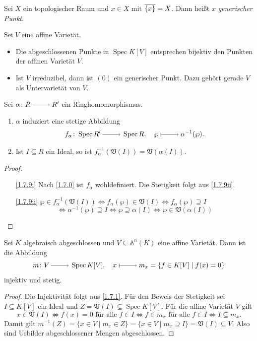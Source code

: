 \documentclass[a4paper,12pt]{scrbook}
\newtheorem{proof}{Beweis}
\def\A{\mathbb{A}}
\def\V{\mathfrak{V}}
\newcommand{\Spec}{\operatorname{Spec}}
\newcommand{\ra}{\raisebox{-1pt}{\tikz{\draw[thin,shorten >=3pt, ->] (0,0) node{\hspace*{-2pt}} -- node{} (1,0);}}\penalty1000\relax}
\renewcommand{\mapsto}{\raisebox{-1pt}{\tikz{\draw[thin,shorten >=3pt, |->] (0,0) node{\hspace*{0pt}} -- node{} (1,0);}}\penalty1000\relax}
\def\Bar#1{\ensuremath\overline{#1}}
\begin{document}
\begin{bem}\label{1.7.7}
  Sei $X$ ein topologischer Raum und $x\in X$ mit $\Bar{\{x\}}=X$. Dann heißt $x$ \emph{generischer Punkt}.
\end{bem}

\begin{bsp}\label{1.7.8}
  Sei $V$ eine affine Varietät.
  \begin{itemize}
  \item Die abgeschlossenen Punkte in $\Spec K[V]$ entsprechen bijektiv den Punkten der affinen Varietät $V$.
  \item Ist $V$ irreduzibel, dann ist $(0)$ ein generischer Punkt. Dazu gehört gerade $V$ als Untervarietät von $V$.
  \end{itemize}
\end{bsp}


\begin{bem}\label{1.7.9}
  Sei $\alpha\colon R\ra R'$ ein Ringhomomorphismus.
  \begin{enumerate}
  \item{} $\alpha$ induziert eine stetige Abbildung \[ f_\alpha\colon \Spec R'\ra\Spec R,\quad
    \wp\mapsto\alpha^{-1}(\wp). \]
  \item{} Ist $I\subseteq R$ ein Ideal, so ist $f_\alpha^{-1}(\V(I))=\V(\alpha(I))$.
  \end{enumerate}
\end{bem}
\begin{proof}
  \begin{enumerate}
  \item[\ref{1.7.9i}] Nach \cref{1.7.0} ist $f_\alpha$ wohldefiniert. Die Stetigkeit folgt aus \ref{1.7.9ii}.
  \item[\ref{1.7.9ii}]
      $\wp\in f_\alpha^{-1}(\V(I)) \iff f_\alpha(\wp)\in\V(I) \iff f_\alpha(\wp)\supseteq I$%
      \[\iff \alpha^{-1}(\wp)\supseteq I \iff \wp\supseteq\alpha(I) \iff \wp\in\V(\alpha(I))\]
  \end{enumerate}
\end{proof}

\begin{prop}\label{1.7.10}
  Sei $K$ algebraisch abgeschlossen und $V\subseteq\A^n(K)$ eine affine Varietät. Dann ist die Abbildung
  \[ m\colon V\ra \Spec K[V], \quad x\mapsto m_x=\{f\in K[V]\mid f(x)=0\} \]
  injektiv und stetig.
\end{prop}
\begin{proof}
  Die Injektivität folgt aus \cref{1.7.1}. Für den Beweis der Stetigkeit sei $I\subseteq K[V]$ ein Ideal und
  $Z=\V(I)\subseteq\Spec K[V]$. Für die affine
  Varietät $V$ gilt
  \[x\in\V(I) \iff f(x)=0 \text{ für alle }f\in I \iff f\in m_x \text{ für alle }f\in I \iff I\subseteq m_x. \]
  Damit gilt $m^{-1}(Z)=\{x\in V\mid m_x\in Z\}=\{x\in V\mid m_x\supseteq I\}=\V(I)\subseteq V$. Also sind Urbilder
  abgeschlossener Mengen abgeschlossen.
\end{proof}
\end{document}
